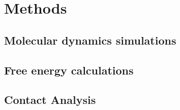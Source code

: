 \chapter{Methods}
\section{Molecular dynamics simulations}

\section{Free energy calculations}

\section{Contact Analysis}
\label{methods:contactana}
